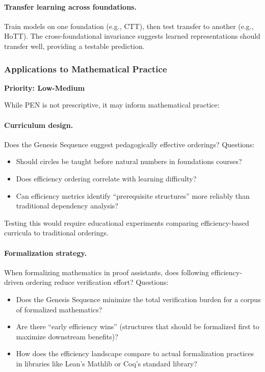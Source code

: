 \documentclass[11pt]{article}
\theoremstyle{definition}
\theoremstyle{remark}
\begin{document}
\paragraph{Transfer learning across foundations.}
Train models on one foundation (e.g., CTT), then test transfer to another (e.g., HoTT). The
cross-foundational invariance suggests learned representations should transfer well, providing a
testable prediction.

\subsubsection{Applications to Mathematical Practice}

\textbf{Priority: Low-Medium}

While PEN is not prescriptive, it may inform mathematical practice:

\paragraph{Curriculum design.}
Does the Genesis Sequence suggest pedagogically effective orderings? Questions:
\begin{itemize}
\item Should circles be taught before natural numbers in foundations courses?
\item Does efficiency ordering correlate with learning difficulty?
\item Can efficiency metrics identify ``prerequisite structures'' more reliably than traditional
dependency analysis?
\end{itemize}

Testing this would require educational experiments comparing efficiency-based curricula to traditional
orderings.

\paragraph{Formalization strategy.}
When formalizing mathematics in proof assistants, does following efficiency-driven ordering reduce
verification effort? Questions:
\begin{itemize}
\item Does the Genesis Sequence minimize the total verification burden for a corpus of formalized
mathematics?
\item Are there ``early efficiency wins'' (structures that should be formalized first to maximize
downstream benefits)?
\item How does the efficiency landscape compare to actual formalization practices in libraries like
Lean's Mathlib or Coq's standard library?
\end{itemize}
\end{document}

